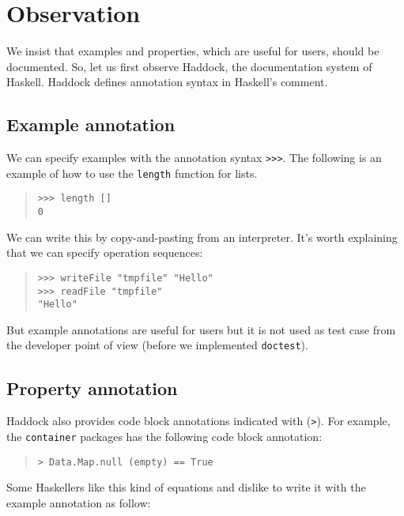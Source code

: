 \documentclass[preprint]{sigplanconf}
\begin{document}
\section{Observation}

We insist that examples and properties, which are useful for users, should be
documented.
So, let us first observe Haddock, the documentation system of Haskell. Haddock defines annotation syntax in Haskell's comment.

\subsection{Example annotation}

We can specify examples with the annotation syntax {\tt >>>}.
The following is an example of how to use the {\tt length} function
for lists.

\begin{quote}
\begin{verbatim}
>>> length []
0
\end{verbatim}
\end{quote}

\noindent We can write this by copy-and-pasting from an interpreter.
It's worth explaining that we can specify operation sequences:

\begin{quote}
\begin{verbatim}
>>> writeFile "tmpfile" "Hello"
>>> readFile "tmpfile"
"Hello"
\end{verbatim}
\end{quote}

\noindent But example annotations are useful for users but 
it is not used as test case from the developer point of view (before we implemented {\tt doctest}).

\subsection{Property annotation}

Haddock also provides code block annotations indicated with ({\tt >}).
For example, the {\tt container} packages has the following code block annotation:

\begin{quote}
\begin{verbatim}
> Data.Map.null (empty) == True
\end{verbatim}
\end{quote}

\noindent Some Haskellers like this kind of equations and dislike to write it with the example annotation as follow:
\end{document}
